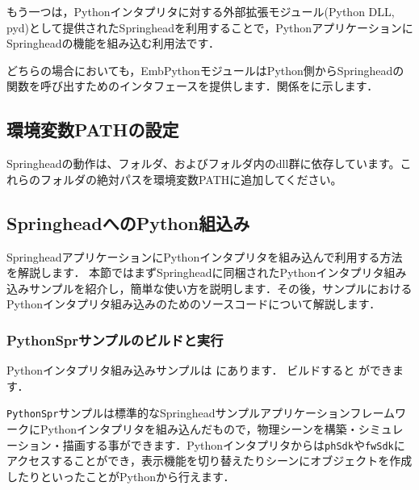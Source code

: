 \KLUDGE もう一つは，Pythonインタプリタに対する外部拡張モジュール(Python DLL, pyd)として提供されたSpringheadを利用することで，PythonアプリケーションにSpringheadの機能を組み込む利用法です．

\KLUDGE どちらの場合においても，EmbPythonモジュールはPython側からSpringheadの関数を呼び出すためのインタフェースを提供します．関係をに示します．

\begin{fig}
\end{fig}

\subsection{環境変数PATHの設定}

Springheadの動作は、フォルダ、およびフォルダ内のdll群に依存しています。これらのフォルダの絶対パスを環境変数PATHに追加してください。


\KLUDGE %
\KLUDGE %
\subsection*{SpringheadへのPython組込み}

SpringheadアプリケーションにPythonインタプリタを組み込んで利用する方法を解説します．
\KLUDGE 本節ではまずSpringheadに同梱されたPythonインタプリタ組み込みサンプルを紹介し，簡単な使い方を説明します．その後，サンプルにおけるPythonインタプリタ組み込みのためのソースコードについて解説します．

\subsubsection*{PythonSprサンプルのビルドと実行}

Pythonインタプリタ組み込みサンプルは  にあります．
\KLUDGE ビルドすると  ができます．

\texttt{PythonSpr}サンプルは標準的なSpringheadサンプルアプリケーションフレームワークにPythonインタプリタを組み込んだもので，物理シーンを構築・シミュレーション・描画する事ができます．Pythonインタプリタからは\texttt{phSdk}や\texttt{fwSdk}にアクセスすることができ，表示機能を切り替えたりシーンにオブジェクトを作成したりといったことがPythonから行えます．

